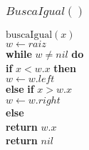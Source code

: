 \documentclass{beamer}
\begin{document}
\begin{frame}
\frametitle{$BuscaIgual()$}
\begin{oframed}
\begin{flushleft}
\hspace*{1em} \ensuremath{\mathrm{buscaIgual}(\ensuremath{\mathit{x}})}\\
\hspace*{1em} \hspace*{1em} \ensuremath{\ensuremath{\mathit{w}} \gets  \ensuremath{raiz}}\\
\hspace*{1em} \hspace*{1em} {\color{black} \textbf{while}} \ensuremath{\ensuremath{\mathit{w}} \ne nil} {\color{black} \textbf{do}} \\
\hspace*{1em} \hspace*{1em} \hspace*{1em} {\color{black} \textbf{if}} \ensuremath{\ensuremath{\mathit{x}} < \ensuremath{\mathit{w}}.x} {\color{black} \textbf{then}} \\
\hspace*{1em} \hspace*{1em} \hspace*{1em} \hspace*{1em} \ensuremath{\ensuremath{\mathit{w}} \gets  \ensuremath{\ensuremath{\mathit{w}}.left}}\\
\hspace*{1em} \hspace*{1em} \hspace*{1em} {\color{black} \textbf{else}} {\color{black} \textbf{if}} \ensuremath{\ensuremath{\mathit{x}} > \ensuremath{\mathit{w}}.\ensuremath{\mathit{x}}}\\
\hspace*{1em} \hspace*{1em} \hspace*{1em} \hspace*{1em} \ensuremath{\ensuremath{\mathit{w}} \gets  \ensuremath{\ensuremath{\mathit{w}}.right}}\\
\hspace*{1em} \hspace*{1em} \hspace*{1em} {\color{black} \textbf{else}} \\
\hspace*{1em} \hspace*{1em} \hspace*{1em} \hspace*{1em} {\color{black} \textbf{return}} \ensuremath{\ensuremath{\mathit{w}}.\ensuremath{\mathit{x}}}\\
\hspace*{1em} \hspace*{1em} {\color{black} \textbf{return}} \ensuremath{\ensuremath{\mathit{nil}}}\\
\end{flushleft}
\end{oframed}

\end{frame}
\end{document}
